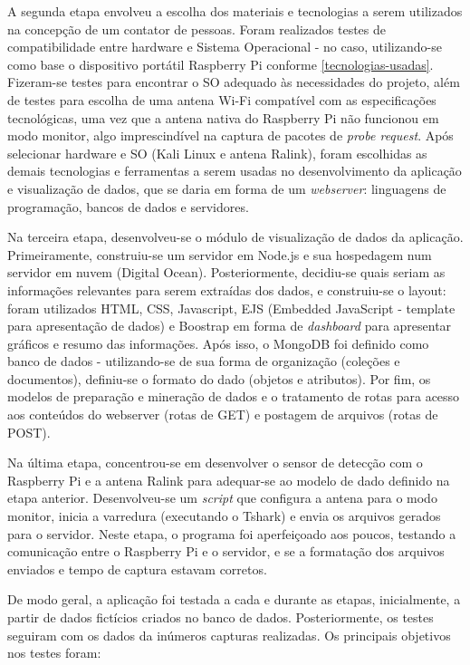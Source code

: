 A segunda etapa envolveu a escolha dos materiais e tecnologias a serem
utilizados na concepção de um contator de pessoas. Foram realizados testes de
compatibilidade entre hardware e Sistema Operacional - no caso, utilizando-se
como base o dispositivo portátil Raspberry Pi conforme
\autoref{tecnologias-usadas}. Fizeram-se testes para encontrar o SO adequado às
necessidades do projeto, além de testes para escolha de uma antena Wi-Fi
compatível com as especificações tecnológicas, uma vez que a antena nativa do
Raspberry Pi não funcionou em modo monitor, algo imprescindível na captura de
pacotes de \emph{probe request}. Após selecionar hardware e SO (Kali Linux e antena Ralink), foram escolhidas as demais
tecnologias e ferramentas a serem usadas no desenvolvimento da aplicação e
visualização de dados, que se daria em forma de um \emph{webserver}: linguagens
de programação, bancos de dados e servidores.

Na terceira etapa, desenvolveu-se o módulo de visualização de dados da aplicação.
Primeiramente, construiu-se um servidor em Node.js e sua hospedagem num servidor em nuvem (Digital Ocean). Posteriormente, decidiu-se quais seriam as informações relevantes para serem extraídas dos dados, e construiu-se o layout: foram utilizados HTML, CSS, Javascript, EJS (Embedded
JavaScript - template para apresentação de dados) e Boostrap em forma de
\emph{dashboard} para apresentar gráficos e resumo das informações. Após isso, o
MongoDB foi definido como banco de dados - utilizando-se de sua forma de
organização (coleções e documentos), definiu-se o formato do dado (objetos e
atributos). Por fim, os modelos de preparação e mineração  de dados e o
tratamento de rotas para acesso aos conteúdos do webserver (rotas de GET) e
postagem de arquivos (rotas de POST).

Na última etapa, concentrou-se em desenvolver o sensor de detecção com o
Raspberry Pi e a antena Ralink para adequar-se ao modelo de dado definido na
etapa anterior. Desenvolveu-se um \emph{script} que configura a antena para o
modo monitor, inicia a varredura (executando o Tshark) e envia os arquivos
gerados para o servidor. Neste etapa, o programa foi aperfeiçoado aos poucos,
testando a comunicação entre o Raspberry Pi e o servidor, e se a formatação dos
arquivos enviados e tempo de captura estavam corretos.

De modo geral, a aplicação foi testada a cada e durante as etapas, inicialmente,
a partir de dados fictícios criados no banco de dados. Posteriormente, os testes
seguiram com os dados da inúmeros capturas realizadas. Os principais objetivos
nos testes foram:

